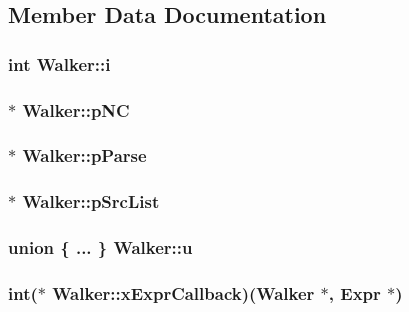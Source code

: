 \subsection{Member Data Documentation}
\hypertarget{struct_walker_a32ef15f76242c0688e243a27b4decd63}{
\subsubsection[{i}]{\setlength{\rightskip}{0pt plus 5cm}int Walker\-::i}}\label{struct_walker_a32ef15f76242c0688e243a27b4decd63}
\hypertarget{struct_walker_adbf5872a6c5a9311adbfe01c0e444388}{
\subsubsection[{p\-N\-C}]{$\ast$ Walker\-::p\-N\-C}}\label{struct_walker_adbf5872a6c5a9311adbfe01c0e444388}
\hypertarget{struct_walker_ac6e8e756b5da8f187b9cf6b94560f352}{
\subsubsection[{p\-Parse}]{$\ast$ Walker\-::p\-Parse}}\label{struct_walker_ac6e8e756b5da8f187b9cf6b94560f352}
\hypertarget{struct_walker_aa09fe5df040b732226cdae1bff741e0d}{
\subsubsection[{p\-Src\-List}]{$\ast$ Walker\-::p\-Src\-List}}\label{struct_walker_aa09fe5df040b732226cdae1bff741e0d}
\hypertarget{struct_walker_a30cf7b40250ecfae7c23f27f67e6a5b6}{
\subsubsection[{u}]{\setlength{\rightskip}{0pt plus 5cm}union \{ ... \}   Walker\-::u}}\label{struct_walker_a30cf7b40250ecfae7c23f27f67e6a5b6}
\hypertarget{struct_walker_a6f4d546e4aea8e6ff1f9512e9190d411}{
\subsubsection[{x\-Expr\-Callback}]{\setlength{\rightskip}{0pt plus 5cm}int($\ast$ Walker\-::x\-Expr\-Callback)({\bf Walker} $\ast$, {\bf Expr} $\ast$)}}\label{struct_walker_a6f4d546e4aea8e6ff1f9512e9190d411}
